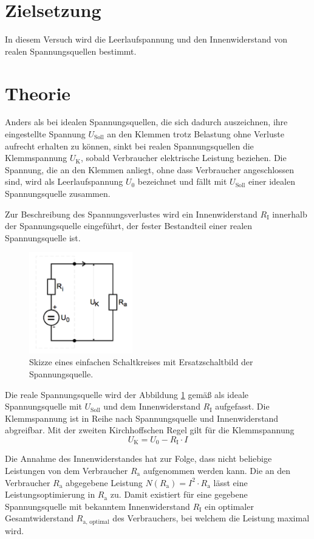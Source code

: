 \section{Zielsetzung}
In diesem Versuch wird die Leerlaufspannung und den Innenwiderstand von realen Spannungsquellen bestimmt.

\section{Theorie}
\label{sec:Theorie}
Anders als bei idealen Spannungsquellen, die sich dadurch auszeichnen, ihre eingestellte Spannung $U_\text{Soll}$ an den Klemmen trotz Belastung ohne Verluste aufrecht erhalten zu können, 
sinkt bei realen Spannungsquellen die Klemmspannung $U_\text{K}$, sobald Verbraucher elektrische Leistung beziehen.
Die Spannung, die an den Klemmen anliegt, ohne dass Verbraucher angeschlossen sind, 
wird als Leerlaufspannung $U_0$ bezeichnet und fällt mit $U_\text{Soll}$ einer idealen Spannungsquelle zusammen.

Zur Beschreibung des Spannungsverlustes wird ein Innenwiderstand $R_\text{I}$ innerhalb der Spannungsquelle eingeführt, der fester Bestandteil einer realen Spannungsquelle ist.
\begin{figure}[ht]
	\centering
  	\includegraphics[width=0.4\textwidth]{Bilder/Innenwiderstand}
	\caption{Skizze eines einfachen Schaltkreises mit Ersatzschaltbild der Spannungsquelle.}
	\label{fig:Innenleben}
\end{figure}
Die reale Spannungsquelle wird der Abbildung \ref{fig:Innenleben} gemäß als ideale Spannungsquelle mit $U_\text{Soll}$ und dem Innenwiderstand $R_\text{I}$ aufgefasst. 
Die Klemmspannung ist in Reihe nach Spannungsquelle und Innenwiderstand abgreifbar.
Mit der zweiten Kirchhoffschen Regel gilt für die Klemmspannung
\begin{equation}
	U_\text{K} = U_\text{0} - R_\text{I}\cdot I
	\label{eq:Klemmspannung}
\end{equation}

Die Annahme des Innenwiderstandes hat zur Folge, dass nicht beliebige Leistungen von dem Verbraucher $R_\text{a}$ aufgenommen werden kann. 
Die an den Verbraucher $R_\text{a}$ abgegebene Leistung $N(R_\text{a}) = I^2\cdot R_\text{a}$ lässt eine Leistungsoptimierung in $R_\text{a}$ zu. 
Damit existiert für eine gegebene Spannungsquelle mit bekanntem Innenwiderstand $R_\text{I}$ ein optimaler Gesamtwiderstand $R_\text{a, optimal}$ des Verbrauchers,
bei welchem die Leistung maximal wird.